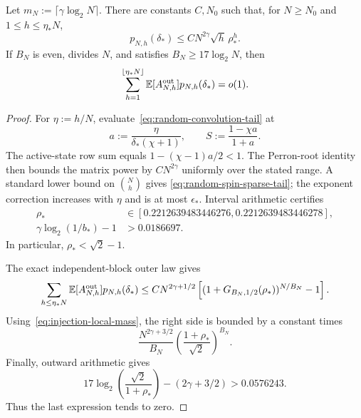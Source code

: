 \begin{lemma}
\label{lem:random-spin-sparse-closure}
Let $m_N:=\lceil\gamma\log_2N\rceil$. There are constants $C,N_0$ such
that, for $N\ge N_0$ and $1\le h\le\eta_*N$,
\begin{equation}
  p_{N,h}(\delta_*)
  \le C N^{2\gamma}\sqrt h\,\rho_*^h.
  \label{eq:random-spin-sparse-tail}
\end{equation}
If $B_N$ is even, divides $N$, and satisfies
$B_N\ge17\log_2N$, then
\begin{equation}
  \sum_{h=1}^{\lfloor\eta_*N\rfloor}
  \mathbb E[A_{N,h}^{\mathrm{out}}]p_{N,h}(\delta_*)
  =o(1).
  \label{eq:random-spin-sparse-sum}
\end{equation}
\end{lemma}

\begin{proof}
For $\eta:=h/N$, evaluate~\eqref{eq:random-convolution-tail} at
\[
  a:=\frac{\eta}{\delta_*(\chi+1)},
  \qquad
  S:=\frac{1-\chi a}{1+a}.
\]
The active-state row sum equals $1-(\chi-1)a/2<1$. The Perron-root identity
then bounds the matrix power by $CN^{2\gamma}$ uniformly over the stated
range. A standard lower bound on $\binom Nh$ gives
\eqref{eq:random-spin-sparse-tail}; the exponent correction increases with
$\eta$ and is at most $\epsilon_*$. Interval arithmetic certifies
\begin{align*}
  \rho_*&\in
  [0.2212639483446276,0.2212639483446278],\\
  \gamma\log_2(1/b_*)-1&>0.0186697.
\end{align*}
In particular, $\rho_*<\sqrt2-1$.

The exact independent-block outer law gives
\[
  \sum_{h\le\eta_*N}
  \mathbb E[A_{N,h}^{\mathrm{out}}]p_{N,h}(\delta_*)
  \le
  C N^{2\gamma+1/2}
  \left[(1+G_{B_N,1/2}(\rho_*))^{N/B_N}-1\right].
\]
Using~\eqref{eq:injection-local-mass}, the right side is bounded by a
constant times
\[
  \frac{N^{2\gamma+3/2}}{B_N}
  \left(\frac{1+\rho_*}{\sqrt2}\right)^{B_N}.
\]
Finally, outward arithmetic gives
\[
  17\log_2\!\left(\frac{\sqrt2}{1+\rho_*}\right)
  -(2\gamma+3/2)>0.0576243.
\]
Thus the last expression tends to zero.
\end{proof}
